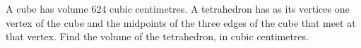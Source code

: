 A cube has volume $624$ cubic centimetres. A tetrahedron has as its vertices one vertex of the cube and the midpoints of the three edges of the cube that meet at that vertex. Find the volume of the tetrahedron, in cubic centimetres.
